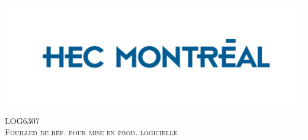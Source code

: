 \begin{titlepage}

\newcommand{\HRule}{\rule{\linewidth}{0.5mm}} %

\center %
 

\newcommand{\corporation}{HEC Montréal}
\newcommand{\majorHeading}{LOG6307}
\newcommand{\minorHeading}{Fouilled de réf. pour mise en prod. logicielle}
\newcommand{\projectTitle}{Quality and Productivity Outcomes Relating to Continuous Integration in GitHub}

\newcommand{\authorFN}{Antoine}
\newcommand{\authorLN}{Gagné}
\newcommand{\matricle}{11225902}



\includegraphics[width=14.38cm,height=5.0cm]{logo_hec.jpg}\\[2.0cm]


\textsc{\Large \majorHeading}\\[0.5cm] %
\textsc{\large \minorHeading}\\[1.0cm] %



\end{titlepage}
